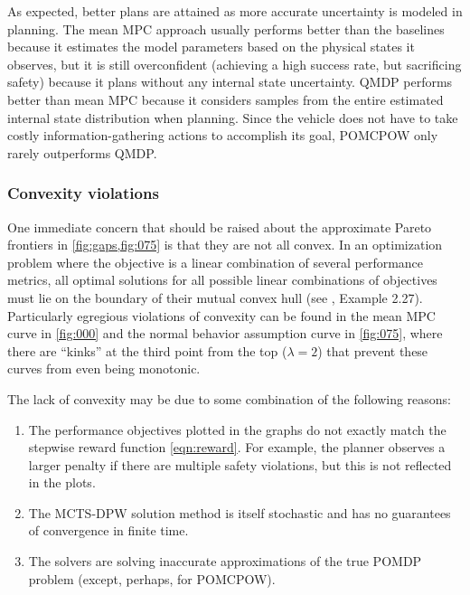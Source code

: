 As expected, better plans are attained as more accurate uncertainty is modeled in planning.
The mean MPC approach usually performs better than the baselines because it estimates the model parameters based on the physical states it observes, but it is still overconfident (achieving a high success rate, but sacrificing safety) because it plans without any internal state uncertainty. 
QMDP performs better than mean MPC because it considers samples from the entire estimated internal state distribution when planning.
Since the vehicle does not have to take costly information-gathering actions to accomplish its goal, POMCPOW only rarely outperforms QMDP.

\subsubsection{Convexity violations}

One immediate concern that should be raised about the approximate Pareto frontiers in \cref{fig:gaps,fig:075} is that they are not all convex.
In an optimization problem where the objective is a linear combination of several performance metrics, all optimal solutions for all possible linear combinations of objectives must lie on the boundary of their mutual convex hull (see \citet{boyd2004convex}, Example 2.27).
Particularly egregious violations of convexity can be found in the mean MPC curve in \cref{fig:000} and the normal behavior assumption curve in \cref{fig:075}, where there are ``kinks'' at the third point from the top ($\lambda=2$) that prevent these curves from even being monotonic.

The lack of convexity may be due to some combination of the following reasons:%
\begin{enumerate}
    \item The performance objectives plotted in the graphs do not exactly match the stepwise reward function \ref{eqn:reward}. For example, the planner observes a larger penalty if there are multiple safety violations, but this is not reflected in the plots.
    \item The MCTS-DPW solution method is itself stochastic and has no guarantees of convergence in finite time.
    \item The solvers are solving inaccurate approximations of the true POMDP problem (except, perhaps, for POMCPOW).
\end{enumerate}

